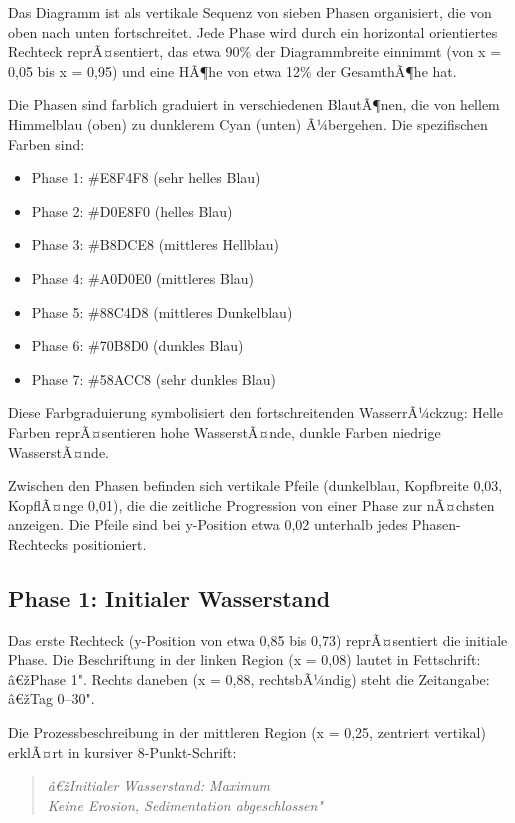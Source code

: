 ﻿\documentclass[12pt,a4paper]{report}
\begin{document}
Das Diagramm ist als vertikale Sequenz von sieben Phasen organisiert, die von oben nach unten fortschreitet. Jede Phase wird durch ein horizontal orientiertes Rechteck reprÃ¤sentiert, das etwa 90\% der Diagrammbreite einnimmt (von x = 0,05 bis x = 0,95) und eine HÃ¶he von etwa 12\% der GesamthÃ¶he hat.

Die Phasen sind farblich graduiert in verschiedenen BlautÃ¶nen, die von hellem Himmelblau (oben) zu dunklerem Cyan (unten) Ã¼bergehen. Die spezifischen Farben sind:
\begin{itemize}
	\item Phase 1: \#E8F4F8 (sehr helles Blau)
	\item Phase 2: \#D0E8F0 (helles Blau)
	\item Phase 3: \#B8DCE8 (mittleres Hellblau)
	\item Phase 4: \#A0D0E0 (mittleres Blau)
	\item Phase 5: \#88C4D8 (mittleres Dunkelblau)
	\item Phase 6: \#70B8D0 (dunkles Blau)
	\item Phase 7: \#58ACC8 (sehr dunkles Blau)
\end{itemize}

Diese Farbgraduierung symbolisiert den fortschreitenden WasserrÃ¼ckzug: Helle Farben reprÃ¤sentieren hohe WasserstÃ¤nde, dunkle Farben niedrige WasserstÃ¤nde.

Zwischen den Phasen befinden sich vertikale Pfeile (dunkelblau, Kopfbreite 0,03, Kopf\-lÃ¤nge 0,01), die die zeitliche Progression von einer Phase zur nÃ¤chsten anzeigen. Die Pfeile sind bei y-Position etwa 0,02 unterhalb jedes Phasen-Rechtecks positioniert.

\subsection{Phase 1: Initialer Wasserstand}

Das erste Rechteck (y-Position von etwa 0,85 bis 0,73) reprÃ¤sentiert die initiale Phase. Die Beschriftung in der linken Region (x = 0,08) lautet in Fettschrift: â€žPhase 1". Rechts daneben (x = 0,88, rechtsbÃ¼ndig) steht die Zeitangabe: â€žTag 0--30".

Die Prozessbeschreibung in der mittleren Region (x = 0,25, zentriert vertikal) erklÃ¤rt in kursiver 8-Punkt-Schrift:
\begin{quote}
	\textit{â€žInitialer Wasserstand: Maximum\\
		Keine Erosion, Sedimentation abgeschlossen"}
\end{quote}
\end{document}
